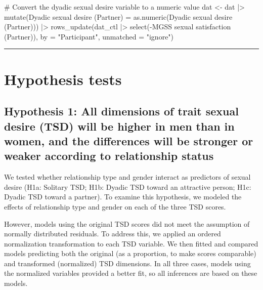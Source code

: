 \documentclass[
  bookmarksnumbered]{article}
\newenvironment{Shaded}{\begin{snugshade}}{\end{snugshade}}
\newcommand{\AttributeTok}[1]{\textcolor[rgb]{0.80,0.80,0.80}{#1}}
\newcommand{\CommentTok}[1]{\textcolor[rgb]{0.50,0.62,0.50}{#1}}
\newcommand{\FunctionTok}[1]{\textcolor[rgb]{0.94,0.94,0.56}{#1}}
\newcommand{\NormalTok}[1]{\textcolor[rgb]{0.80,0.80,0.80}{#1}}
\newcommand{\OtherTok}[1]{\textcolor[rgb]{0.94,0.94,0.56}{#1}}
\newcommand{\SpecialCharTok}[1]{\textcolor[rgb]{0.86,0.64,0.64}{#1}}
\newcommand{\StringTok}[1]{\textcolor[rgb]{0.80,0.58,0.58}{#1}}
\begin{document}
\begin{Shaded}
\begin{Highlighting}[]
\CommentTok{\# Convert the dyadic sexual desire variable to a numeric value}
\NormalTok{dat }\OtherTok{\textless{}{-}}\NormalTok{ dat }\SpecialCharTok{|\textgreater{}}
  \FunctionTok{mutate}\NormalTok{(}\StringTok{\textasciigrave{}}\AttributeTok{Dyadic sexual desire (Partner)}\StringTok{\textasciigrave{}} \OtherTok{=} \FunctionTok{as.numeric}\NormalTok{(}\StringTok{\textasciigrave{}}\AttributeTok{Dyadic sexual desire (Partner)}\StringTok{\textasciigrave{}}\NormalTok{)) }\SpecialCharTok{|\textgreater{}}
  \FunctionTok{rows\_update}\NormalTok{(dat\_ctl }\SpecialCharTok{|\textgreater{}}
                \FunctionTok{select}\NormalTok{(}\SpecialCharTok{{-}}\StringTok{\textasciigrave{}}\AttributeTok{MGSS sexual satisfaction (Partner)}\StringTok{\textasciigrave{}}\NormalTok{), }
  \AttributeTok{by =} \StringTok{"Participant"}\NormalTok{, }\AttributeTok{unmatched =} \StringTok{"ignore"}\NormalTok{)}
\end{Highlighting}
\end{Shaded}

\begin{center}\rule{0.5\linewidth}{0.5pt}\end{center}

\section{Hypothesis tests}\label{hypothesis-tests}

\subsection{Hypothesis 1: All dimensions of trait sexual desire (TSD) will be higher in men than in women, and the differences will be stronger or weaker according to relationship status}\label{hyp1}

We tested whether relationship type and gender interact as predictors of sexual desire (H1a: Solitary TSD; H1b: Dyadic TSD toward an attractive person; H1c: Dyadic TSD toward a partner). To examine this hypothesis, we modeled the effects of relationship type and gender on each of the three TSD scores.

However, models using the original TSD scores did not meet the assumption of normally distributed residuals. To address this, we applied an ordered normalization transformation to each TSD variable. We then fitted and compared models predicting both the original (as a proportion, to make scores comparable) and transformed (normalized) TSD dimensions. In all three cases, models using the normalized variables provided a better fit, so all inferences are based on these models.
\end{document}
